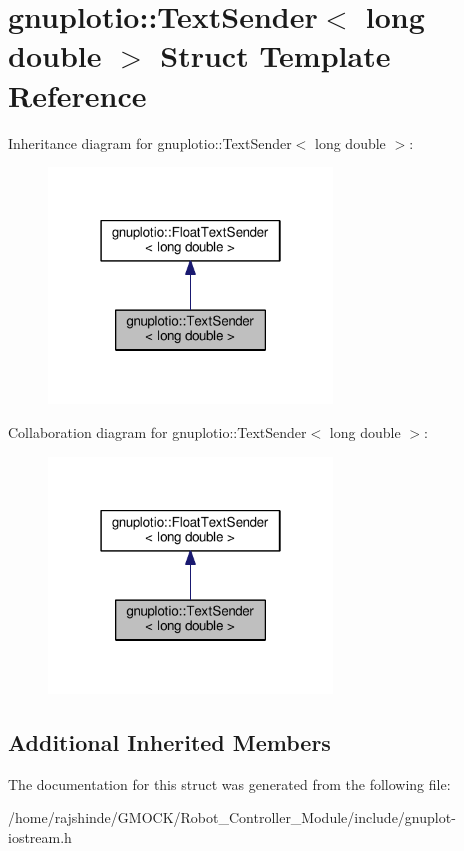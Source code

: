 \hypertarget{structgnuplotio_1_1_text_sender_3_01long_01double_01_4}{}\section{gnuplotio\+:\+:Text\+Sender$<$ long double $>$ Struct Template Reference}
\label{structgnuplotio_1_1_text_sender_3_01long_01double_01_4}


Inheritance diagram for gnuplotio\+:\+:Text\+Sender$<$ long double $>$\+:
\nopagebreak
\begin{figure}[H]
\begin{center}
\leavevmode
\includegraphics[width=214pt]{structgnuplotio_1_1_text_sender_3_01long_01double_01_4__inherit__graph}
\end{center}
\end{figure}


Collaboration diagram for gnuplotio\+:\+:Text\+Sender$<$ long double $>$\+:
\nopagebreak
\begin{figure}[H]
\begin{center}
\leavevmode
\includegraphics[width=214pt]{structgnuplotio_1_1_text_sender_3_01long_01double_01_4__coll__graph}
\end{center}
\end{figure}
\subsection*{Additional Inherited Members}


The documentation for this struct was generated from the following file\+:\begin{DoxyCompactItemize}
\item 
/home/rajshinde/\+G\+M\+O\+C\+K/\+Robot\+\_\+\+Controller\+\_\+\+Module/include/gnuplot-\/iostream.\+h\end{DoxyCompactItemize}
